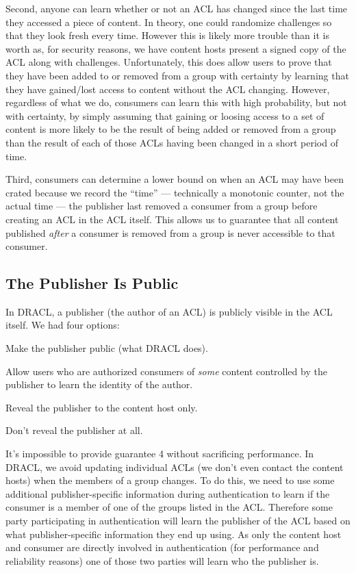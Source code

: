 \documentclass[pdftex,12pt,a4papaer]{report}
\begin{document}
Second, anyone can learn whether or not an ACL has changed since the last time
they accessed a piece of content. In theory, one could randomize challenges so
that they look fresh every time. However this is likely more trouble
than it is worth as, for security reasons, we have content hosts present a
signed copy of the ACL along with challenges. Unfortunately, this does allow
users to prove that they have been added to or removed from a group with
certainty by learning that they have gained/lost access to content without the
ACL changing. However, regardless of what we do, consumers can learn this with
high probability, but not with certainty, by simply assuming that gaining or
loosing access to a set of content is more likely to be the result of being
added or removed from a group than the result of each of those ACLs having been
changed in a short period of time.

Third, consumers can determine a lower bound on when an ACL may have been crated
because we record the ``time'' --- technically a monotonic counter, not the
actual time --- the publisher last removed a consumer from a group before creating
an ACL in the ACL itself. This allows us to guarantee that all content published
\emph{after} a consumer is removed from a group is never accessible to that
consumer.

\subsection{The Publisher Is Public}

In DRACL, a publisher (the author of an ACL) is publicly visible in the ACL
itself. We had four options:

\begin{compactenum}
\item Make the publisher public (what DRACL does).
\item Allow users who are authorized consumers of \emph{some} content controlled
  by the publisher to learn the identity of the author.
\item Reveal the publisher to the content host only.
\item Don't reveal the publisher at all.
\end{compactenum}

It's impossible to provide guarantee 4 without sacrificing performance. In
DRACL, we avoid updating individual ACLs (we don't even contact the content
hosts) when the members of a group changes. To do this, we need to use some
additional publisher-specific information during authentication to learn if the
consumer is a member of one of the groups listed in the ACL\@. Therefore some
party participating in authentication will learn the publisher of the ACL based on
what publisher-specific information they end up using. As only the content host and
consumer are directly involved in authentication (for performance and
reliability reasons) one of those two parties will learn who the publisher is.
\end{document}
